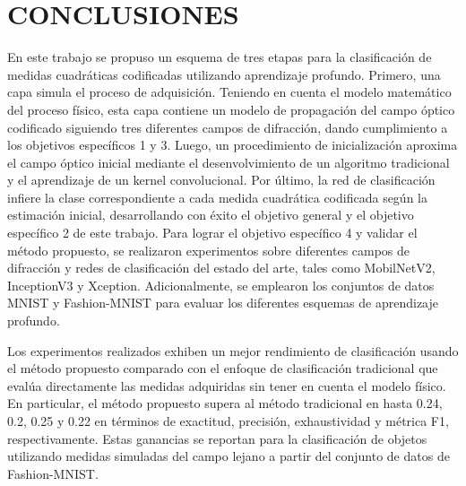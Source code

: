 
\chapter{CONCLUSIONES}


En este trabajo se propuso un esquema de tres etapas para la clasificación de medidas cuadráticas codificadas utilizando aprendizaje profundo. Primero, una capa simula el proceso de adquisición. Teniendo en cuenta el modelo matemático del proceso físico, esta capa contiene un modelo de propagación del campo óptico codificado siguiendo tres diferentes campos de difracción, dando cumplimiento a los objetivos específicos 1 y 3. Luego, un procedimiento de inicialización aproxima el campo óptico inicial mediante el desenvolvimiento de un algoritmo tradicional y el aprendizaje de un kernel convolucional. Por último, la red de clasificación infiere la clase correspondiente a cada medida cuadrática codificada según la estimación inicial, desarrollando con éxito el objetivo general y el objetivo específico 2 de este trabajo. Para lograr el objetivo específico 4 y validar el método propuesto, se realizaron experimentos sobre diferentes campos de difracción y redes de clasificación del estado del arte, tales como MobilNetV2, InceptionV3 y Xception. Adicionalmente, se emplearon los conjuntos de datos MNIST y Fashion-MNIST para evaluar los diferentes esquemas de aprendizaje profundo.

Los experimentos realizados exhiben un mejor rendimiento de clasificación usando el método propuesto comparado con el enfoque de clasificación tradicional que evalúa directamente las medidas adquiridas sin tener en cuenta el modelo físico. En particular, el método propuesto supera al método tradicional en hasta 0.24, 0.2, 0.25 y 0.22 en términos de exactitud, precisión, exhaustividad y métrica F1, respectivamente. Estas ganancias se reportan para la clasificación de objetos utilizando medidas simuladas del campo lejano a partir del conjunto de datos de Fashion-MNIST.